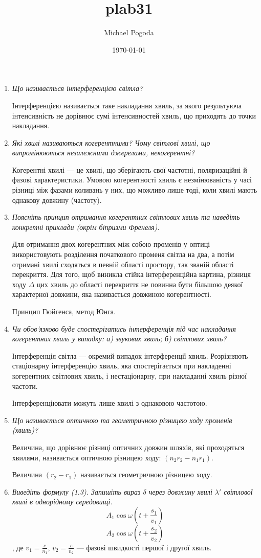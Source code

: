 \documentclass[a4paper,10pt,notitlepage,pdftex,headsepline]{scrartcl}
\author{Michael Pogoda}
\title{plab31}
\date{\today}
\begin{document}
\begin{enumerate}
\item \textit{Що називається інтерференцією світла?}

Інтерференцією називається таке накладання хвиль, за якого результуюча інтенсивність не дорівнює сумі інтенсивностей хвиль, що приходять до точки накладання.
\item \textit{Які хвилі називаються когерентними? Чому світлові хвилі, що випромінюються незалежними джерелами, некогерентні?}

Когерентні хвилі --- це хвилі, що зберігають свої частотні, поляризаційні й фазові характеристики.
Умовою когерентності хвиль є незмінюваність у часі різниці між фазами коливань у них, що можливо лише тоді, коли хвилі мають однакову довжину (частоту).
\item \textit{Поясніть принцип отримання когерентних світлових хвиль та наведіть конкретні приклади (окрім біпризми Френеля).}

Для отримання двох когерентних між собою променів у оптиці використовують розділення початкового променя світла на два, а потім отримані хвилі сходяться в певній області простору, так званій області перекриття.
Для того, щоб виникла стійка інтерференційна картина, різниця ходу $\Delta$ цих хвиль до області перекриття не повинна бути більшою деякої характерної довжини, яка
називається довжиною когерентності.

Принцип Гюйгенса, метод Юнга.
\item \textit{Чи обов’язково буде спостерігатись інтерференція під час накладання когерентних хвиль у випадку: а) звукових хвиль; б) світлових хвиль?}

Інтерференція світла --- окремий випадок інтерференції хвиль.
Розрізняють стаціонарну інтерференцію хвиль, яка спостерігається при накладенні когерентних світлових хвиль, і нестаціонарну, при накладанні хвиль різної частоти. 

Інтерференціювати можуть лише хвилі з однаковою частотою.
\item \textit{Що називається оптичною та геометричною різницею ходу променів (хвиль)?}

Величина, що дорівнює різниці оптичних довжин шляхів, які проходяться хвилями, називається оптичною різницею ходу: $(n_2 r_2 - n_1 r_1)$.

Величина $(r_2 - r_1)$ називається геометричною різницею ходу.
\item \textit{Виведіть формулу (1.3). Запишіть вираз $\delta$ через довжину хвилі $\lambda'$ світлової хвилі в однорідному середовищі.}
$$A_1 \cos{\omega\left(t+\frac{s_1}{v_1}\right)}$$
$$A_2 \cos{\omega\left(t+\frac{s_2}{v_2}\right)}$$,
де $v_1 = \frac{c}{n_1}$, $v_2 = \frac{c}{n_2}$ --- фазові швидкості першої і другої хвиль.


\end{enumerate}
\end{document}
